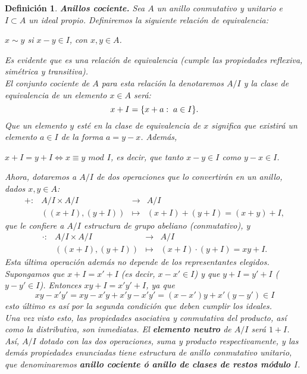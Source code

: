 \documentclass[12pt]{article}
\newtheorem{definition}[theorem]{Definición}
\begin{document}
\begin{definition}\label{eq:ancoci} \textbf{\textit{Anillos cociente.}} Sea $A$ un anillo conmutativo y unitario e $I \subset A$ un ideal propio. Definiremos la siguiente relación de equivalencia: \begin{center}
$x \sim y$ si $x-y \in I$, con $x,y \in A$.
\end{center}
Es evidente que es una relación de equivalencia (cumple las propiedades reflexiva, simétrica y transitiva).\vspace{0.2cm}\\
El conjunto cociente de $A$ para esta relación la denotaremos $A/I$ y la clase de equivalencia de un elemento $x \in A$ será: $$x + I = \lbrace x + a  : \hspace{0.1cm} a \in I \rbrace.$$
Que un elemento $y$ esté en la clase de equivalencia de $x$ significa que existirá un elemento $a \in I$ de la forma $a = y-x$. Además,\begin{center}
$x + I = y + I  \Leftrightarrow x \equiv y$ $mod$ $I$, es decir, que tanto $x-y \in I$ como $y-x \in I$.
\end{center} 
Ahora, dotaremos a $A/I$ de dos operaciones que lo convertirán en un anillo, dados $x,y \in A$: 
$$\begin{array}{rccl}
+ \colon &A/I \times A/I&\longrightarrow & A/I\\
&((x + I),(y + I)) & \longmapsto &(x + I) + (y + I) = (x + y) + I,
\end{array}
$$ que le confiere a $A/I$ estructura de grupo abeliano (conmutativo), y
$$\begin{array}{rccl}
\cdot \colon &A/I \times A/I&\longrightarrow & A/I\\
&((x + I),(y + I)) & \longmapsto &(x + I)\cdot(y + I) = xy + I.
\end{array}
$$ Esta última operación además no depende de los representantes elegidos. Supongamos que $x + I = x' + I$ (es decir, $x-x' \in I$) y que $y + I = y' + I$ ($y-y' \in I$). Entonces $xy + I = x'y' + I$, ya que $$xy -x'y' = xy - x'y + x'y - x'y' = (x-x')y + x'(y-y') \in I$$ esto último es así por la segunda condición que deben cumplir los ideales.\vspace{0.2cm}\\
Una vez visto esto, las propiedades  asociativa y conmutativa del producto, así como la distributiva, son inmediatas. El \textbf{elemento neutro} de $A/I$ será $1 + I$. Así, $A/I$ dotado con las dos operaciones, suma y producto respectivamente, y las demás propiedades enunciadas tiene estructura de anillo conmutativo unitario, que denominaremos \textbf{anillo cociente ó anillo de clases de restos módulo $I$}.\vspace{0.2cm}\\

\end{definition}
\end{document}
